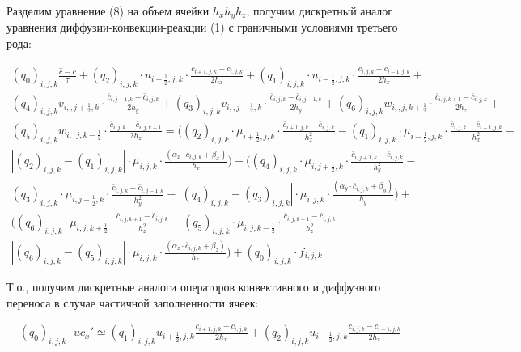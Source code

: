 \documentclass[12pt]{article}
\begin{document}
Разделим уравнение (8) на объем ячейки $h_xh_yh_z$, получим дискретный аналог уравнения диффузии-конвекции-реакции (1) с граничными условиями третьего рода:

\begin{multline} 
	(q_0)_{i,j,k}\frac{\hat{c}-c}{\tau} + (q_2)_{i,j,k}\cdot u_{i+\frac{1}{2},j,k} \cdot \frac{\bar{c}_{i+1,j,k}-\bar{c}_{i,j,k}}{2h_x}   + (q_1)_{i,j,k}\cdot u_{i-\frac{1}{2},j,k} \cdot \frac{\bar{c}_{i,j,k}-\bar{c}_{i-1,j,k}}{2h_x} + \\ (q_4)_{i,j,k}v_{i,,j+\frac{1}{2},k}\cdot\frac{\bar{c}_{i,j+1,k}-\bar{c}_{i,j,k}}{2h_y} + (q_3)_{i,j,k}v_{i,,j-\frac{1}{2},k}\cdot\frac{\bar{c}_{i,j,k}-\bar{c}_{i,j-1,k}}{2h_y} + (q_6)_{i,j,k}w_{i,,j,k+\frac{1}{2}}\cdot\frac{\bar{c}_{i,j,k+1}-\bar{c}_{i,j,k}}{2h_z} + \\ (q_5)_{i,j,k}w_{i,,j,k-\frac{1}{2}}\cdot\frac{\bar{c}_{i,j,k}-\bar{c}_{i,j,k-1}}{2h_z} = ( (q_2)_{i,j,k}\cdot\mu_{i+\frac{1}{2},j,k}\cdot \frac{\bar{c}_{i+1,j,k}-\bar{c}_{i,j,k}}{h_x^2} -  (q_1)_{i,j,k}\cdot\mu_{i-\frac{1}{2},j,k}\cdot \frac{\bar{c}_{i,j,k}-\bar{c}_{i-1,j,k}}{h_x^2} - \\
	|(q_2)_{i,j,k}-(q_1)_{i,j,k}| \cdot \mu_{i,j,k}\cdot \frac{(\alpha_x\cdot\bar{c}_{i,j,k}+\beta_x)}{h_x} ) + ((q_4)_{i,j,k}\cdot\mu_{i,j+\frac{1}{2},k}\cdot \frac{\bar{c}_{i,j+1,k}-\bar{c}_{i,j,k}}{h_y^2} - \\ (q_3)_{i,j,k}\cdot\mu_{i,j-\frac{1}{2},k}\cdot \frac{\bar{c}_{i,j,k}-\bar{c}_{i,j-1,k}}{h_y^2} - |(q_4)_{i,j,k} - (q_3)_{i,j,k}| \cdot \mu_{i,j,k}\cdot \frac{(\alpha_y\cdot\bar{c}_{i,j,k}+\beta_y)}{h_y} ) + \\
	( (q_6)_{i,j,k}\cdot\mu_{i,j,k+\frac{1}{2}}\cdot \frac{\bar{c}_{i,j,k+1}-\bar{c}_{i,j,k}}{h_z^2} - 	 (q_5)_{i,j,k}\cdot\mu_{i,j,k-\frac{1}{2}}\cdot \frac{\bar{c}_{i,j,k-1}-\bar{c}_{i,j,k}}{h_z^2} - \\ |(q_6)_{i,j,k} - (q_5)_{i,j,k}| \cdot\mu_{i,j,k}\cdot \frac{(\alpha_z\cdot\bar{c}_{i,j,k}+\beta_z)}{h_z} ) + (q_0)_{i,j,k}\cdot f_{i,j,k}
\end{multline} 

 Т.о., получим дискретные аналоги операторов конвективного и диффузного переноса в случае частичной заполненности ячеек:
 
\begin{multline*} 
	(q_0)_{i,j,k}\cdot uc_x'\simeq (q_1)_{i,j,k}u_{i+\frac{1}{2},j,k}\frac{c_{i+1,j,k}-c_{i,j,k}}{2h_x} + (q_2)_{i,j,k}u_{i-\frac{1}{2},j,k}\frac{c_{i,j,k}-c_{i-1,j,k}}{2h_x}
\end{multline*} 	
 
\end{document}
